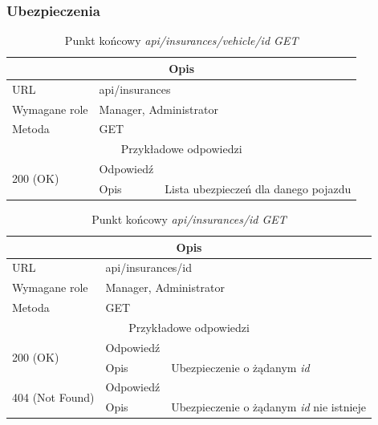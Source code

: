 \documentclass[eng,printmode,openany]{mgr}
\begin{document}
	\subsubsection{Ubezpieczenia}
	\begin{table}[H]
		\caption{Punkt końcowy \textit{api/insurances/vehicle/id GET}}
		\begin{tabularx}{\textwidth}{|l|l|X|}
			\hline
			\multicolumn{3}{|c|}{Opis}                         						\\ \hline
			URL                       & \multicolumn{2}{l|}{api/insurances} 	    \\ \hline
			Wymagane role             & \multicolumn{2}{l|}{Manager, Administrator}               \\ \hline
			Metoda                    & \multicolumn{2}{l|}{GET} 					\\ \hline
			\multicolumn{3}{|c|}{ Przykładowe odpowiedzi}                   		\\ \hline
			\multirow{2}{*}{200 (OK)} 			& Odpowiedź     &        \\ \cline{2-3} 
			& Opis         	& Lista ubezpieczeń dla danego pojazdu		      		                            \\ \hline
		\end{tabularx}
	\end{table}
	
	\begin{table}[H]
		\caption{Punkt końcowy \textit{api/insurances/id GET}}
		\begin{tabularx}{\textwidth}{|l|l|X|}
			\hline
			\multicolumn{3}{|c|}{Opis}                         						\\ \hline
			URL                       & \multicolumn{2}{l|}{api/insurances/id} 	    \\ \hline
			Wymagane role             & \multicolumn{2}{l|}{Manager, Administrator}               \\ \hline
			Metoda                    & \multicolumn{2}{l|}{GET} 					\\ \hline
			\multicolumn{3}{|c|}{ Przykładowe odpowiedzi}                   		\\ \hline
			\multirow{2}{*}{200 (OK)} 			& Odpowiedź    	&         	\\ \cline{2-3} 
			& Opis         	& Ubezpieczenie o żądanym \textit{id}      									                \\ \hline
			\multirow{2}{*}{404 (Not Found)} 	& Odpowiedź     &      \\ \cline{2-3} 
			& Opis          & Ubezpieczenie o żądanym \textit{id} nie istnieje      									\\ \hline
		\end{tabularx}
	\end{table}
	
\end{document}
